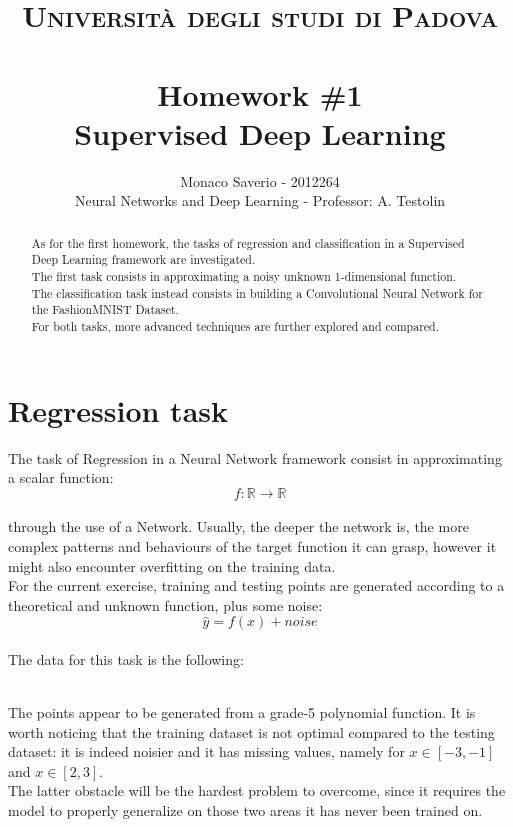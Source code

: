 \documentclass[11pt,a4paper,twocolumn]{IEEEtran}
\author{Monaco Saverio - 2012264 \sepline \\Neural Networks and Deep Learning - Professor: A. Testolin}
\title{{\normalsize\textsc{Università degli studi di Padova}}\vspace{-.5cm} \\ \sepline\\ \textbf{Homework \#1
\\ Supervised Deep Learning}}
\begin{document}
	\maketitle
	\begin{abstract} As for the first homework, the tasks of regression and classification in a Supervised Deep Learning framework are investigated.\\ The first task consists in approximating a noisy unknown 1-dimensional function.\\ The classification task instead consists in building a Convolutional Neural Network for the FashionMNIST Dataset.\\
	For both tasks, more advanced techniques are further explored and compared.
	\end{abstract}
			\section{\textbf{Regression task}}
			The task of Regression in a Neural Network framework consist in approximating a scalar function:\vspace*{-.3cm}
			$$f:\mathbb{R}\to\mathbb{R}$$\vspace*{-.5cm}\\
			through the use of a Network. Usually, the deeper the network is, the more complex patterns and behaviours of the target function it can grasp, however it might also encounter overfitting on the training data.\\
			 For the current exercise, training and testing points are generated according to a theoretical and unknown function, plus some noise:\vspace*{-.1cm}
			$$\hat{y}=f(x) + noise$$\vspace*{-1cm}\\
			
			The data for this task is the following:\vspace*{-.5cm}
			\begin{figure}[h]
				\centering
				
			\end{figure}\\
			The points appear to be generated from a grade-5 polynomial function. It is worth noticing that the training dataset is not optimal compared to the testing dataset: it is indeed noisier and it has missing values, namely for $x\in[-3,-1]$ and $x\in[2,3]$.\\
			The latter obstacle will be the hardest problem to overcome, since it requires the model to properly generalize on those two areas it has never been trained on.
\end{document}
